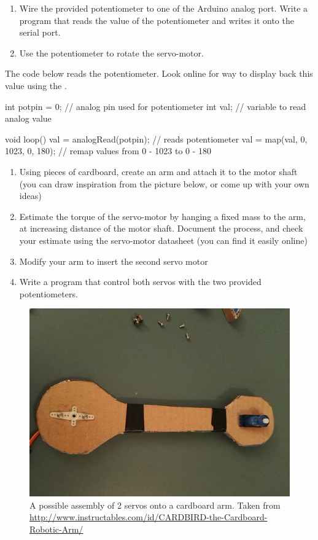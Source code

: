 \documentclass{instructions}
\begin{document}
\begin{enumerate}
    \item Wire the provided potentiometer to one of the Arduino analog port.
        Write a program that reads the value of the potentiometer and writes it
        onto the serial port.
    \item Use the potentiometer to rotate the servo-motor.
\end{enumerate}

The code below reads the potentiometer. Look online for way to display back this
value using the .

\begin{cppcode}

int potpin = 0;  // analog pin used for potentiometer
int val;    // variable to read analog value

void loop() {
  val = analogRead(potpin); // reads potentiometer
  val = map(val, 0, 1023, 0, 180); // remap values from 0 - 1023 to 0 - 180
}

\end{cppcode}



\begin{enumerate}
    \item Using pieces of cardboard, create an arm and attach it to the motor
        shaft (you can draw inspiration from the picture below, or come up with
        your own ideas)
    \item Estimate the torque of the servo-motor by hanging a fixed mass to the
        arm, at increasing distance of the motor shaft. Document the process,
        and check your estimate using the servo-motor datasheet (you can find it
        easily online)
    \item Modify your arm to insert the second servo motor
    \item Write a program that control both servos with the two provided
        potentiometers.
\end{enumerate}

\begin{figure}[h!]
    \centering
    \includegraphics[width=0.9\linewidth]{figs/arm-cardboard}
    \caption{A possible assembly of 2 servos onto a cardboard arm. Taken from
    \url{http://www.instructables.com/id/CARDBIRD-the-Cardboard-Robotic-Arm/}}
    \label{}
\end{figure}
\end{document}

